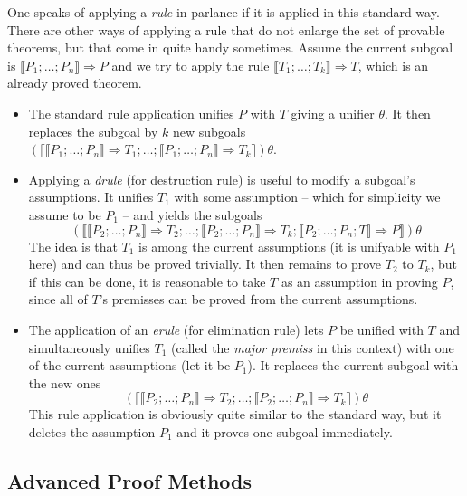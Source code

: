 One speaks of applying a \emph{rule} in \Isabelle parlance if it is applied in
this standard way. There are other ways of applying a rule that do not enlarge
the set of provable theorems, but that come in quite handy sometimes. Assume the
current subgoal is $\llbracket P_1;\ldots;P_n\rrbracket \Longrightarrow P$ and we try to apply the rule $\llbracket T_1;\ldots;T_k\rrbracket \Longrightarrow
T$, which is an already proved theorem.
\begin{itemize}
\item  The standard rule application unifies $P$ with $T$ giving a unifier $\theta$. It
  then replaces the subgoal by $k$ new subgoals $(\llbracket \llbracket P_1;\ldots;P_n\rrbracket \Longrightarrow T_1; \ldots;
  \llbracket P_1;\ldots;P_n\rrbracket \Longrightarrow T_k\rrbracket)\theta$. 
\item Applying a \emph{drule} (for destruction rule) is useful to modify a
  subgoal's assumptions. It unifies $T_1$ with some assumption -- which for
  simplicity we assume to be $P_1$ -- and yields the subgoals 
  \[(\llbracket \llbracket P_2;\ldots;P_n\rrbracket \Longrightarrow
  T_2; \ldots; \llbracket P_2;\ldots;P_n\rrbracket \Longrightarrow T_k; \llbracket P_2; \ldots; P_n; T\rrbracket \Longrightarrow P\rrbracket)\theta\] 
  The idea is that $T_1$ is among the current assumptions (it is unifyable with
  $P_1$ here) and can thus be proved trivially. It then remains to prove $T_2$
  to $T_k$, but if this can be done, it is reasonable to take $T$ as an
  assumption in proving $P$, since all of $T$'s premisses can be proved from the
  current assumptions. 

\item The application of an \emph{erule} (for elimination rule) lets $P$ be
  unified with $T$ and simultaneously unifies $T_1$ (called the \emph{major
    premiss} in this context) with one of the current assumptions (let it be
  $P_1$). It replaces the current subgoal with the new ones
  \[ (\llbracket \llbracket P_2;\ldots;P_n\rrbracket \Longrightarrow T_2; \ldots; \llbracket P_2;\ldots;P_n\rrbracket \Longrightarrow T_k\rrbracket)\theta \]
  This rule application is obviously quite similar to the standard way, but it
  deletes the assumption $P_1$ and it proves one subgoal immediately.
\end{itemize}

\subsection{Advanced Proof Methods}
\label{sec:adv-proof-meth}

